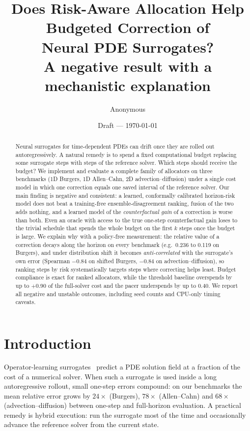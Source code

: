 \documentclass[11pt]{article}
\title{Does Risk-Aware Allocation Help Budgeted Correction of\\ Neural PDE Surrogates?\\
\large A negative result with a mechanistic explanation}
\author{Anonymous}
\date{Draft --- \today}
\begin{document}
\maketitle

\begin{abstract}
Neural surrogates for time-dependent PDEs can drift once they are rolled out
autoregressively. A natural remedy is to spend a fixed computational budget
replacing some surrogate steps with steps of the reference solver. Which steps
should receive the budget? We implement and evaluate a complete family of
allocators on three benchmarks (1D Burgers, 1D Allen--Cahn, 2D
advection--diffusion) under a single cost model in which one correction equals
one saved interval of the reference solver. Our main finding is negative and
consistent: a learned, conformally calibrated horizon-risk model does not beat a
training-free ensemble-disagreement ranking, fusion of the two adds nothing, and
a learned model of the \emph{counterfactual gain} of a correction is worse than
both. Even an oracle with access to the true one-step counterfactual gain loses
to the trivial schedule that spends the whole budget on the first $k$ steps once
the budget is large. We explain why with a policy-free measurement: the relative
value of a correction decays along the horizon on every benchmark (e.g.\ 0.236
to 0.119 on Burgers), and under distribution shift it becomes
\emph{anti-correlated} with the surrogate's own error (Spearman $-0.84$ on
shifted Burgers, $-0.84$ on advection--diffusion), so ranking steps by risk
systematically targets steps where correcting helps least. Budget compliance is
exact for ranked allocators, while the threshold baseline overspends by up to
$+0.90$ of the full-solver cost and the pacer underspends by up to $0.40$.
We report all negative and unstable outcomes, including seed counts and
CPU-only timing caveats.
\end{abstract}

\section{Introduction}

Operator-learning surrogates~\cite{li2021fno,lu2021deeponet,kovachki2023neural}
predict a PDE solution field at a fraction of the cost of a numerical solver.
When such a surrogate is used inside a long autoregressive rollout, small
one-step errors compound: on our benchmarks the mean relative error grows by
$24\times$ (Burgers), $78\times$ (Allen--Cahn) and $68\times$
(advection--diffusion) between one-step and full-horizon evaluation. A
practical remedy is hybrid execution: run the surrogate most of the time and
occasionally advance the reference solver from the current state.
\end{document}
